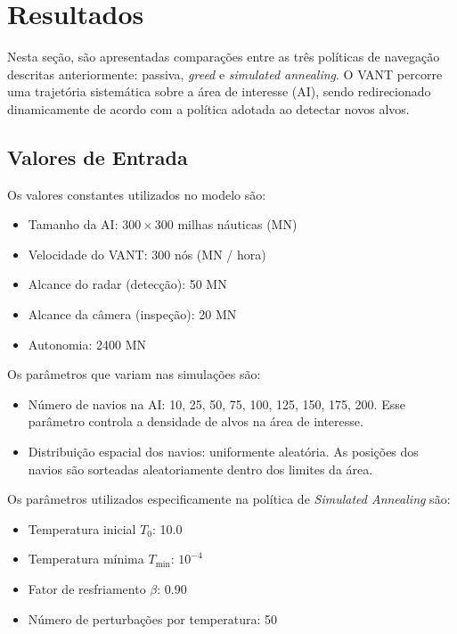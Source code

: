 \section{Resultados}

Nesta seção, são apresentadas comparações entre as três políticas de navegação descritas anteriormente: passiva, \textit{greed} e \textit{simulated annealing}. O VANT percorre uma trajetória sistemática sobre a área de interesse (AI), sendo redirecionado dinamicamente de acordo com a política adotada ao detectar novos alvos.

\subsection{Valores de Entrada}

Os valores constantes utilizados no modelo são:

\begin{itemize}
    \item Tamanho da AI: $300 \times 300$ milhas náuticas (MN)
    \item Velocidade do VANT: 300 nós (MN / hora)
    \item Alcance do radar (detecção): 50 MN
    \item Alcance da câmera (inspeção): 20 MN
    \item Autonomia: 2400 MN
\end{itemize}

Os parâmetros que variam nas simulações são:

\begin{itemize}
    \item Número de navios na AI: 10, 25, 50, 75, 100, 125, 150, 175, 200. Esse parâmetro controla a densidade de alvos na área de interesse.
    
    \item Distribuição espacial dos navios: uniformente aleatória. As posições dos navios são sorteadas aleatoriamente dentro dos limites da área.
\end{itemize}

Os parâmetros utilizados especificamente na política de \textit{Simulated Annealing} são:

\begin{itemize}
    \item Temperatura inicial $T_0$: 10.0
    \item Temperatura mínima $T_{\text{min}}$: $10^{-4}$
    \item Fator de resfriamento $\beta$: 0.90
    \item Número de perturbações por temperatura: 50
\end{itemize}

